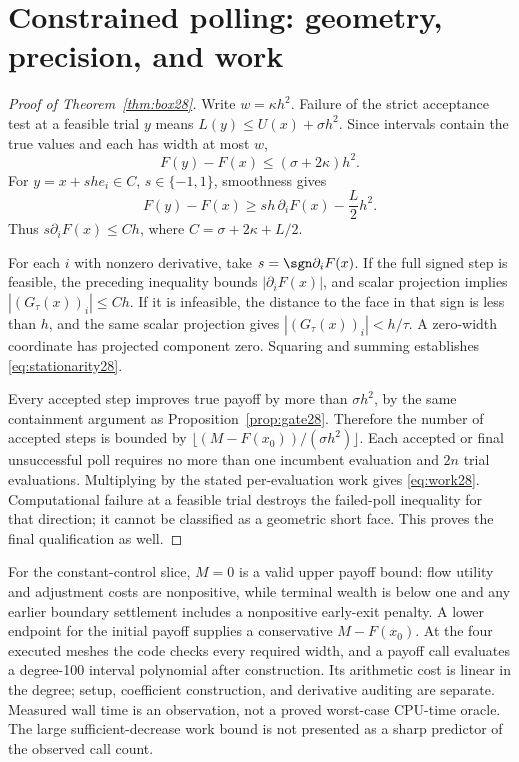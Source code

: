 \section{Constrained polling: geometry, precision, and work}\label{app:box28}
\begin{proof}[Proof of Theorem~\ref{thm:box28}]
Write $w=\kappa h^2$. Failure of the strict acceptance test at a feasible trial $y$ means $L(y)\le U(x)+\sigma h^2$. Since intervals contain the true values and each has width at most $w$,
\begin{equation}
 F(y)-F(x)\le(\sigma+2\kappa)h^2.
\end{equation}
For $y=x+she_i\in C$, $s\in\{-1,1\}$, smoothness gives
\begin{equation}
 F(y)-F(x)\ge sh\,\partial_iF(x)-\frac L2h^2.
\end{equation}
Thus $s\partial_iF(x)\le Ch$, where $C=\sigma+2\kappa+L/2$.

For each $i$ with nonzero derivative, take $s=\sgn\partial_iF(x)$. If the full signed step is feasible, the preceding inequality bounds $|\partial_iF(x)|$, and scalar projection implies $|(G_\tau(x))_i|\le Ch$. If it is infeasible, the distance to the face in that sign is less than $h$, and the same scalar projection gives $|(G_\tau(x))_i|<h/\tau$. A zero-width coordinate has projected component zero. Squaring and summing establishes \eqref{eq:stationarity28}.

Every accepted step improves true payoff by more than $\sigma h^2$, by the same containment argument as Proposition~\ref{prop:gate28}. Therefore the number of accepted steps is bounded by $\lfloor(M-F(x_0))/(\sigma h^2)\rfloor$. Each accepted or final unsuccessful poll requires no more than one incumbent evaluation and $2n$ trial evaluations. Multiplying by the stated per-evaluation work gives \eqref{eq:work28}. Computational failure at a feasible trial destroys the failed-poll inequality for that direction; it cannot be classified as a geometric short face. This proves the final qualification as well.
\end{proof}

For the constant-control slice, $M=0$ is a valid upper payoff bound: flow utility and adjustment costs are nonpositive, while terminal wealth is below one and any earlier boundary settlement includes a nonpositive early-exit penalty. A lower endpoint for the initial payoff supplies a conservative $M-F(x_0)$. At the four executed meshes the code checks every required width, and a payoff call evaluates a degree-100 interval polynomial after construction. Its arithmetic cost is linear in the degree; setup, coefficient construction, and derivative auditing are separate. Measured wall time is an observation, not a proved worst-case CPU-time oracle. The large sufficient-decrease work bound is not presented as a sharp predictor of the observed call count.

